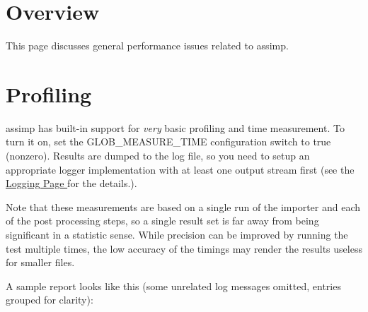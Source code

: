 \hypertarget{perf_perf_overview}{}\section{Overview}\label{perf_perf_overview}
This page discusses general performance issues related to assimp.\hypertarget{perf_perf_profile}{}\section{Profiling}\label{perf_perf_profile}
assimp has built-\/in support for {\itshape very} basic profiling and time measurement. To turn it on, set the {\ttfamily G\+L\+O\+B\+\_\+\+M\+E\+A\+S\+U\+R\+E\+\_\+\+T\+I\+M\+E} configuration switch to {\ttfamily true} (nonzero). Results are dumped to the log file, so you need to setup an appropriate logger implementation with at least one output stream first (see the \hyperlink{usage_logging}{Logging Page } for the details.).

Note that these measurements are based on a single run of the importer and each of the post processing steps, so a single result set is far away from being significant in a statistic sense. While precision can be improved by running the test multiple times, the low accuracy of the timings may render the results useless for smaller files.

A sample report looks like this (some unrelated log messages omitted, entries grouped for clarity)\+:

